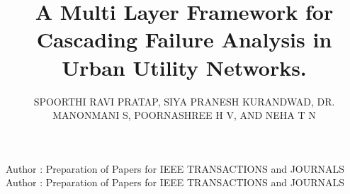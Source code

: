 \documentclass[oneside]{ieeeaccess}
\begin{document}

\title{A Multi Layer Framework for Cascading Failure Analysis in Urban Utility Networks.}
\author{\uppercase{Spoorthi Ravi Pratap},
\uppercase{Siya Pranesh Kurandwad}, \uppercase{Dr. Manonmani S}, \uppercase{Poornashree H V}, AND \uppercase{Neha T N}}

\address[1]{Department of Computer Science and Engineering, R V College of Engineering, Bangalore, Karnataka, India (e-mail: spoorthiravip.cs23@rvce.edu.in, memory.siya@gmail.com, manonmanis@rvce.edu.in)}
\address[2]{Department of Information Science and Engineering, R V College of Engineering, Bangalore, Karnataka, India (e-mail: poornashreehv.is24@rvce.edu.in)}
\address[3]{Department of Computer Science and Engineering - Cyber Security, R V College of Engineering, Bangalore, Karnataka, India  (email: nehatn.cy24@rvce.edu.in)}

\markboth
{Author \headeretal: Preparation of Papers for IEEE TRANSACTIONS and JOURNALS}
{Author \headeretal: Preparation of Papers for IEEE TRANSACTIONS and JOURNALS}

\end{document}

